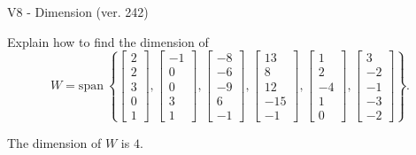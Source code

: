 \begin{exercise}
  \begin{exerciseTitle}V8 - Dimension (ver. 242)\end{exerciseTitle}
  \begin{exerciseStatement}
    Explain how to find the dimension of 
\[W=\mathrm{span}\ \left\{\left[\begin{array}{r}
2 \\
2 \\
3 \\
0 \\
1
\end{array}\right] , \left[\begin{array}{r}
-1 \\
0 \\
0 \\
3 \\
1
\end{array}\right] , \left[\begin{array}{r}
-8 \\
-6 \\
-9 \\
6 \\
-1
\end{array}\right] , \left[\begin{array}{r}
13 \\
8 \\
12 \\
-15 \\
-1
\end{array}\right] , \left[\begin{array}{r}
1 \\
2 \\
-4 \\
1 \\
0
\end{array}\right] , \left[\begin{array}{r}
3 \\
-2 \\
-1 \\
-3 \\
-2
\end{array}\right]\right\}.\]



  \end{exerciseStatement}
  \begin{exerciseAnswer}
   The dimension of \(W\) is  \(4\).
  


  \end{exerciseAnswer}
\end{exercise}